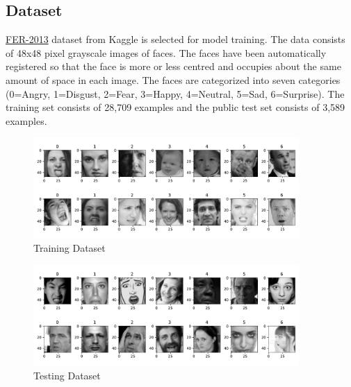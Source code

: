 \documentclass[11pt,a4paper]{article}
\begin{document}
    
    \subsection{Dataset}
    \href{https://www.kaggle.com/datasets/msambare/fer2013}{FER-2013} \cite{FER2013} dataset from Kaggle is selected for model training. The data consists of 48x48 pixel grayscale images of faces. The faces have been automatically registered so that the face is more or less centred and occupies about the same amount of space in each image. The faces are categorized into seven categories (0=Angry, 1=Disgust, 2=Fear, 3=Happy, 4=Neutral, 5=Sad, 6=Surprise). The training set consists of 28,709 examples and the public test set consists of 3,589 examples. 
    \begin{figure}[H]
        \centering
        \includegraphics[width = 0.9\textwidth]{emotion_detection/plot/train.pdf}
        \caption{Training Dataset}
        \label{fig:train_dataset}
    \end{figure}
    \begin{figure}[H]
        \centering
        \includegraphics[width = 0.9\textwidth]{emotion_detection/plot/test.pdf}
        \caption{Testing Dataset}
        \label{fig:test_dataset}
    \end{figure}
    
    
\end{document}
